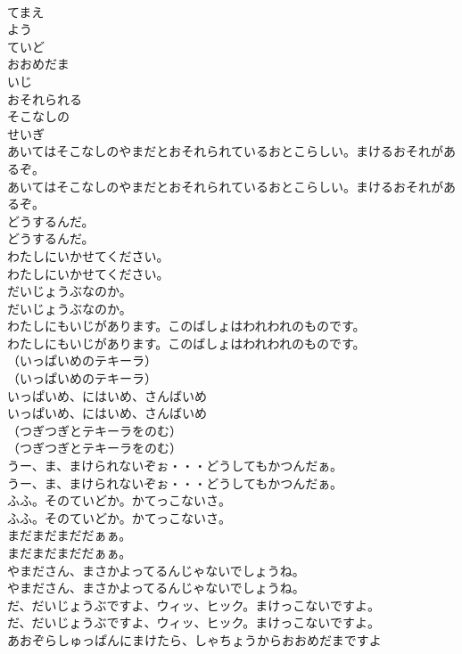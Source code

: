 \documentclass[8pt]{extreport}
\begin{document}
\begin{CJK}{UTF8}{min}
\\	てまえ
\\	よう
\\	ていど
\\	おおめだま
\\	いじ
\\	おそれられる
\\	そこなしの
\\	せいぎ
\\	あいてはそこなしのやまだとおそれられているおとこらしい。まけるおそれがあるぞ。
\\	あいてはそこなしのやまだとおそれられているおとこらしい。まけるおそれがあるぞ。
\\	どうするんだ。
\\	どうするんだ。
\\	わたしにいかせてください。
\\	わたしにいかせてください。
\\	だいじょうぶなのか。
\\	だいじょうぶなのか。
\\	わたしにもいじがあります。このばしょはわれわれのものです。
\\	わたしにもいじがあります。このばしょはわれわれのものです。
\\	（いっぱいめのテキーラ）
\\	（いっぱいめのテキーラ）
\\	いっぱいめ、にはいめ、さんばいめ
\\	いっぱいめ、にはいめ、さんばいめ
\\	（つぎつぎとテキーラをのむ）
\\	（つぎつぎとテキーラをのむ）
\\	うー、ま、まけられないぞぉ・・・どうしてもかつんだぁ。
\\	うー、ま、まけられないぞぉ・・・どうしてもかつんだぁ。
\\	ふふ。そのていどか。かてっこないさ。
\\	ふふ。そのていどか。かてっこないさ。
\\	まだまだまだだぁぁ。
\\	まだまだまだだぁぁ。
\\	やまださん、まさかよってるんじゃないでしょうね。
\\	やまださん、まさかよってるんじゃないでしょうね。
\\	だ、だいじょうぶですよ、ウィッ、ヒック。まけっこないですよ。
\\	だ、だいじょうぶですよ、ウィッ、ヒック。まけっこないですよ。
\\	あおぞらしゅっぱんにまけたら、しゃちょうからおおめだまですよ

\end{CJK}
\end{document}
